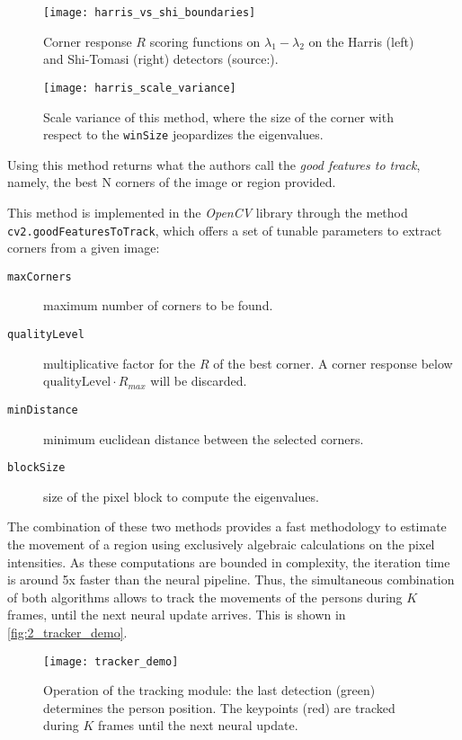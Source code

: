 \begin{figure}[h]
	\centering
	\texttt{[image: harris\_vs\_shi\_boundaries]}
	\caption{Corner response $R$ scoring functions on $\lambda_1-\lambda_2$ on the Harris (left) and Shi-Tomasi (right) detectors (source:\cite{nanonets_optical_flow}).}
	\label{fig:2_harris_vs_shi}
\end{figure}

\begin{figure}[h]
	\centering
	\texttt{[image: harris\_scale\_variance]}
	\caption{Scale variance of this method, where the size of the corner with respect to the \texttt{winSize} jeopardizes the eigenvalues.}
	\label{fig:2_harris_scale}
\end{figure}

Using this method returns what the authors call the \textit{good features to track}, namely, the best N corners of the image or region provided.

 This method is implemented in the \textit{OpenCV} library through the method \texttt{cv2.goodFeaturesToTrack}, which offers a set of tunable parameters to extract corners from a given image:
 \begin{description}
 	\item[\texttt{maxCorners}] maximum number of corners to be found.
 	\item[\texttt{qualityLevel}] multiplicative factor for the $R$ of the best corner. A corner response below $\text{qualityLevel}\cdot R_{max}$ will be discarded.
 	\item[\texttt{minDistance}] minimum euclidean distance between the selected corners.
 	\item[\texttt{blockSize}] size of the pixel block to compute the eigenvalues.
 \end{description}

The combination of these two methods provides a fast methodology to estimate the movement of a region using exclusively algebraic calculations on the pixel intensities. As these computations are bounded in complexity, the iteration time is around 5x faster than the neural pipeline. Thus, the simultaneous combination of both algorithms allows to track the movements of the persons during $K$ frames, until the next neural update arrives. This is shown in \autoref{fig:2_tracker_demo}.\\

\begin{figure}[h]
	\centering
	\texttt{[image: tracker\_demo]}
	\caption{Operation of the tracking module: the last detection (green) determines the person position. The keypoints (red) are tracked during $K$ frames until the next neural update.}
	\label{fig:2_tracker_demo}
\end{figure}

